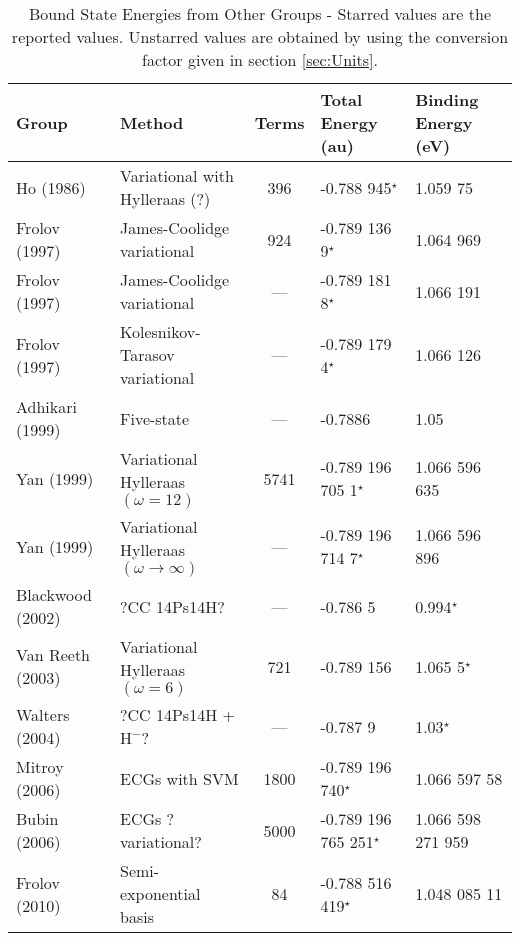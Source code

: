 \documentclass[Dissertation.tex]{subfiles}
\begin{document}
\begin{table}[H]
\begin{center}
\begin{tabular}{l l c l l}
\toprule
Group & Method & Terms & Total Energy (au) & Binding Energy (eV)\\
\midrule
Ho (1986) \cite{Ho1986} & Variational with Hylleraas (?) & 396 & -0.788 945$^\star$ & 1.059 75 \\
Frolov (1997) \cite{Frolov1997a} & James-Coolidge variational & 924 & -0.789 136 9$^\star$ & 1.064 969 \\
Frolov (1997) \cite{Frolov1997a} & James-Coolidge variational & --- & -0.789 181 8$^\star$ & 1.066 191 \\
Frolov (1997) \cite{Frolov1997c} & Kolesnikov-Tarasov variational & --- & -0.789 179 4$^\star$ & 1.066 126 \\
Adhikari (1999) \cite{Adhikari1999} & Five-state & --- & -0.7886 & 1.05 \\
Yan (1999) \cite{Yan1999} & Variational Hylleraas $(\omega = 12)$ & 5741 & -0.789 196 705 1$^\star$ & 1.066 596 635 \\
Yan (1999) \cite{Yan1999} & Variational Hylleraas $(\omega \rightarrow \infty)$ & --- & -0.789 196 714 7$^\star$ & 1.066 596 896 \\
Blackwood (2002) \cite{Blackwood2002} & ?CC 14Ps14H? & --- & -0.786 5 & 0.994$^\star$ \\
Van Reeth (2003) \cite{VanReeth2003} & Variational Hylleraas $(\omega = 6)$ & 721 & -0.789 156 & 1.065 5$^\star$ \\
Walters (2004) \cite{Walters2004} & ?CC 14Ps14H + $\text{H}^-$? & --- & -0.787 9 & 1.03$^\star$\\
Mitroy (2006) \cite{Mitroy2006} & ECGs with SVM & 1800 & -0.789 196 740$^\star$ & 1.066 597 58 \\
Bubin (2006) \cite{Bubin2006} & ECGs ?variational? & 5000 & -0.789 196 765 251$^\star$ & 1.066 598 271 959 \\
Frolov (2010) \cite{Frolov2010} & Semi-exponential basis & 84 & -0.788 516 419$^\star$ & 1.048 085 11 \\
\bottomrule
\end{tabular}
\caption{Bound State Energies from Other Groups - Starred values are the reported values.  Unstarred values are obtained by using the conversion factor given in section \ref{sec:Units}.}
\label{tab:BoundEnergyOther}
\end{center}
\end{table}
\end{document}
